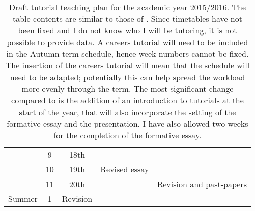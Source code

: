 \begin{table}
\begin{tabular}{c c c l l}
			 & \hphantom{0}9  & 18th		&			& \\
			 & 10		  & 19th		& Revised essay		& \\
			 & 11		  & 20th		&			& Revision and past-papers \\
\midrule
\multirow{1}{*}{Summer}	 & \hphantom{0}1  & Revision		&			& \\
 \bottomrule
\end{tabular}
\caption{Draft tutorial teaching plan for the academic year 2015/2016. The table contents are similar to those of . Since timetables have not been fixed and I do not know who I will be tutoring, it is not possible to provide data. A careers tutorial will need to be included in the Autumn term schedule, hence week numbers cannot be fixed. The insertion of the careers tutorial will mean that the schedule will need to be adapted; potentially this can help spread the workload more evenly through the term. The most significant change compared to  is the addition of an introduction to tutorials at the start of the year, that will also incorporate the setting of the formative essay and the presentation. I have also allowed two weeks for the completion of the formative essay.}\label{tab:2015-16}
\end{table}
